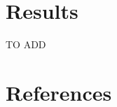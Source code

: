 \documentclass{article}
\begin{document}
\section{Results}

TO ADD




\section*{References}



\end{document}
